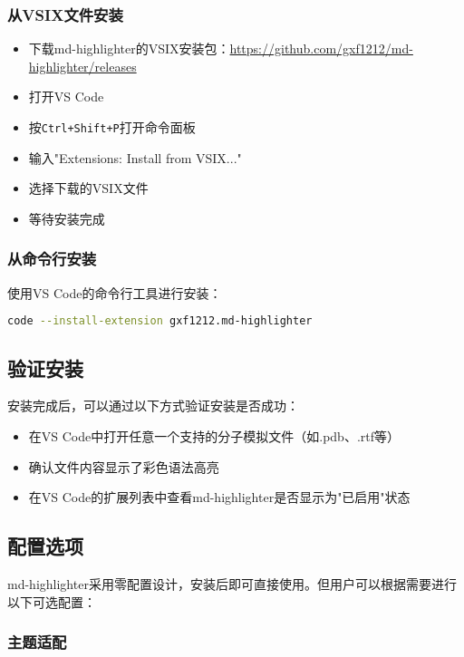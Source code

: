 \subsubsection{从VSIX文件安装}

\begin{itemize}
    \item 下载md-highlighter的VSIX安装包：\url{https://github.com/gxf1212/md-highlighter/releases}
    \item 打开VS Code
    \item 按\texttt{Ctrl+Shift+P}打开命令面板
    \item 输入"Extensions: Install from VSIX..."
    \item 选择下载的VSIX文件
    \item 等待安装完成
\end{itemize}

\subsubsection{从命令行安装}

使用VS Code的命令行工具进行安装：
\begin{lstlisting}[style=blockstyle,language=bash]
code --install-extension gxf1212.md-highlighter
\end{lstlisting}

\subsection{验证安装}

安装完成后，可以通过以下方式验证安装是否成功：

\begin{itemize}
    \item 在VS Code中打开任意一个支持的分子模拟文件（如.pdb、.rtf等）
    \item 确认文件内容显示了彩色语法高亮
    \item 在VS Code的扩展列表中查看md-highlighter是否显示为"已启用"状态
\end{itemize}

\subsection{配置选项}

md-highlighter采用零配置设计，安装后即可直接使用。但用户可以根据需要进行以下可选配置：

\subsubsection{主题适配}

